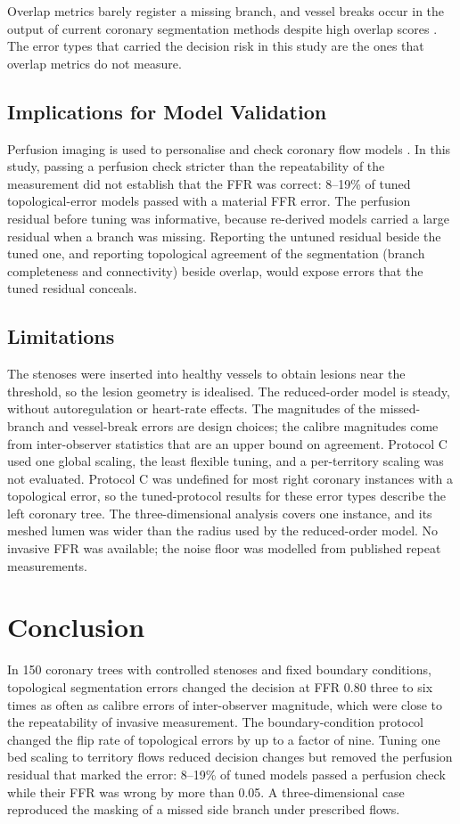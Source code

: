 \documentclass[journal]{IEEEtran}
\begin{document}
Overlap metrics barely register a missing branch, and vessel breaks occur in the output of current coronary
segmentation methods despite high overlap scores \cite{bransby2026}. The error types that carried the decision risk
in this study are the ones that overlap metrics do not measure.

\subsection{Implications for Model Validation}
Perfusion imaging is used to personalise and check coronary flow models \cite{menon2024}. In this study, passing a perfusion check
stricter than the repeatability of the measurement did not establish that the FFR was correct: 8--19\% of tuned
topological-error models passed with a material FFR error. The perfusion residual before tuning was informative,
because re-derived models carried a large residual when a branch was missing. Reporting the untuned residual beside
the tuned one, and reporting topological agreement of the segmentation (branch completeness and connectivity) beside
overlap, would expose errors that the tuned residual conceals.

\subsection{Limitations}
The stenoses were inserted into healthy vessels to obtain lesions near the threshold, so the lesion geometry is
idealised. The reduced-order model is steady, without autoregulation or heart-rate effects. The magnitudes of the
missed-branch and vessel-break errors are design choices; the calibre magnitudes come from inter-observer statistics
that are an upper bound on agreement. Protocol C used one global scaling, the least flexible tuning, and a
per-territory scaling was not evaluated. Protocol C was undefined for most right coronary instances with a
topological error, so the tuned-protocol results for these error types describe the left coronary tree. The
three-dimensional analysis covers one instance, and its meshed lumen was wider than the radius used by the
reduced-order model. No invasive FFR was available; the noise floor was modelled from published repeat measurements.

\section{Conclusion}
In 150 coronary trees with controlled stenoses and fixed boundary conditions, topological segmentation errors
changed the decision at FFR 0.80 three to six times as often as calibre errors of inter-observer magnitude, which were close to the repeatability of
invasive measurement. The boundary-condition protocol changed the flip rate of topological errors by up to a factor of nine. Tuning one bed scaling to territory flows reduced decision changes but removed the perfusion residual that
marked the error: 8--19\% of tuned models passed a perfusion check while their FFR was wrong by more than 0.05. A
three-dimensional case reproduced the masking of a missed side branch under prescribed flows.
\end{document}

